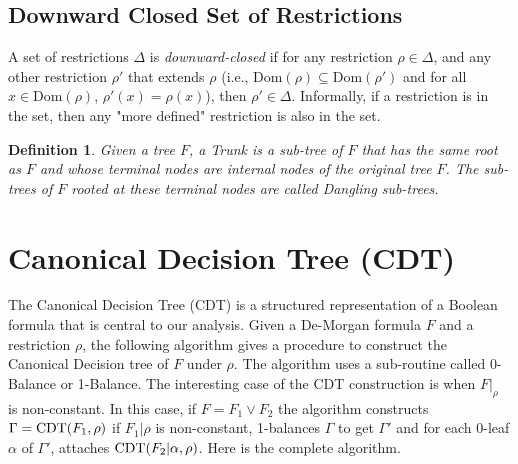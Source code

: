 \documentclass[11pt]{article}
\newtheorem{definition}[theorem]{Definition}
\begin{document}
\subsection{Downward Closed Set of Restrictions}
A set of restrictions $\Delta$ is \emph{downward-closed} if for any restriction $\rho \in \Delta$, and any other restriction $\rho'$ that extends $\rho$ (i.e., $\text{Dom}(\rho) \subseteq \text{Dom}(\rho')$ and for all $x \in \text{Dom}(\rho)$, $\rho'(x) = \rho(x)$), then $\rho' \in \Delta$. Informally, if a restriction is in the set, then any "more defined" restriction is also in the set.

\begin{definition}
\label{def: trunk}
    Given a tree $F$, a \emph{Trunk} is a sub-tree of $F$ that has the same root as $F$ and whose terminal nodes are internal nodes of the original tree $F$. The sub-trees of $F$ rooted at these terminal nodes are called \emph{Dangling sub-trees}.
\end{definition}

\section{Canonical Decision Tree (CDT)}
\label{sec:cdt}

The Canonical Decision Tree (CDT) is a structured representation of a Boolean formula that is central to our analysis.
Given a De-Morgan formula $F$ and a restriction $\rho$, the following algorithm gives a procedure to construct the Canonical Decision tree of $F$ under $\rho$. The algorithm uses a sub-routine called 0-Balance or 1-Balance. The interesting case of the CDT construction is when $F|_\rho$ is non-constant. In this case, if $F = F_1 \lor F_2$ the algorithm constructs  $\Gamma = \operatorname{CDT}(F_1,\rho)$ if $F_1|\rho$ is non-constant, 1-balances $\Gamma$ to get $\Gamma'$ and for each 0-leaf $\alpha$ of $\Gamma'$, attaches $\operatorname{CDT}(F_2|\alpha, \rho)$. Here is the complete algorithm. 
\end{document}
